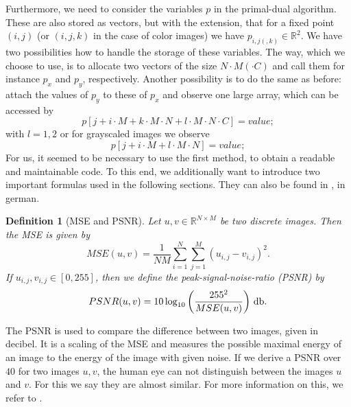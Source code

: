 \documentclass{scrreprt}
\newtheorem{definition}[theorem]{Definition}
\begin{document}
        Furthermore, we need to consider the variables $p$ in the primal-dual algorithm. These are also stored as vectors, but with the extension, that for a fixed point $(i, j)$ (or $(i, j, k)$ in the case of color images) we have $p_{i,j(,k)} \in \mathbb{R}^{2}$. We have two possibilities how to handle the storage of these variables. The way, which we choose to use, is to allocate two vectors of the size $N \cdot M ( \cdot C)$ and call them for instance $p_{x}$ and $p_{y}$, respectively.
        Another possibility is to do the same as before: attach the values of $p_{y}$ to these of $p_{x}$ and observe one large array, which can be accessed by
            $$
                p[j + i \cdot M + k \cdot M \cdot N + l \cdot M \cdot N \cdot C] = value;
            $$
        with $l = 1, 2$ or for grayscaled images we observe
            $$
                p[j + i \cdot M + l \cdot M \cdot N] = value;
            $$
        For us, it seemed to be necessary to use the first method, to obtain a readable and maintainable code. To this end, we additionally want to introduce two important formulas used in the following sections. They can also be found in \cite{Bredies}, in german.

        \begin{definition}[MSE and PSNR]
            Let $u, v \in \mathbb{R}^{N \times M}$ be two discrete images. Then the MSE is given by
                \begin{equation}
                    MSE(u,v) = \frac{1}{NM} \sum_{i = 1}^{N} \sum_{j = 1}^{M} (u_{i,j} - v_{i,j})^{2}.
                    \label{eq:mse}
                \end{equation}
            If $u_{i,j}, v_{i,j} \in [0, 255]$, then we define the peak-signal-noise-ratio (PSNR) by
                \begin{equation}
                    PSNR(u, v) = 10 \log_{10} \left( \frac{255^{2}}{MSE(u,v)} \right)\, \textnormal{db}.
                    \label{eq:psnr}
                \end{equation}
        \end{definition}

        The PSNR is used to compare the difference between two images, given in decibel. It is a scaling of the MSE and measures the possible maximal energy of an image to the energy of the image with given noise. If we derive a PSNR over $40$ for two images $u,v$, the human eye can not distinguish between the images $u$ and $v$. For this we say they are almost similar. For more information on this, we refer to \cite{Bredies}.
\end{document}
